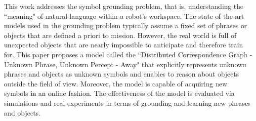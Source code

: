This work addresses the symbol grounding problem, that is, understanding the ``meaning" of natural language within a robot's workspace. The state of the art models used in the grounding problem typically assume a fixed set of phrases or objects that are defined a priori to mission. However, the real world is full of unexpected objects that are nearly impossible to anticipate and therefore train for. This paper proposes a model called the ``Distributed Correspondence Graph - Unknown Phrase, Unknown Percept - Away" that explicitly represents unknown phrases and objects as unknown symbols and enables to reason about objects outside the field of view. Moreover, the model is capable of acquiring new symbols in an online fashion. The effectiveness of the model is evaluated via simulations and real experiments in terms of grounding and learning new phrases and objects.



